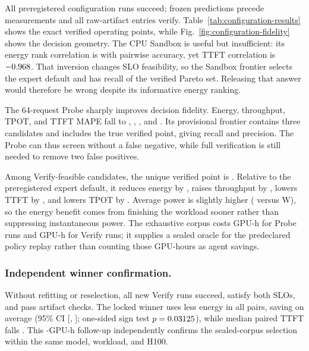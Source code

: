 All \ConfigurationMeasuredRuns{} preregistered configuration runs succeed;
frozen predictions precede measurements and all \ConfigurationRawArtifacts{}
raw-artifact entries verify.  Table~\ref{tab:configuration-results} shows the
exact verified operating points, while
Fig.~\ref{fig:configuration-fidelity} shows the decision geometry.  The CPU
Sandbox is useful but insufficient: its energy rank correlation is
\LzeroEnergySpearman{} with \LzeroEnergyPairwise{} pairwise accuracy, yet TTFT
correlation is $-0.968{}$.  That inversion changes SLO feasibility,
so the Sandbox frontier selects the expert default and has
\LzeroParetoRecall{} recall of the verified Pareto set.  Releasing that answer would
therefore be wrong despite its informative energy ranking.

The 64-request Probe sharply improves decision fidelity.  Energy,
throughput, TPOT, and TTFT MAPE fall to \LoneEnergyMAPE{},
\LoneThroughputMAPE{}, \LoneTPOTMAPE{}, and \LoneTTFTMAPE{}.  Its provisional
frontier contains three candidates and includes the true verified point, giving
\LoneParetoRecall{} recall and \LoneParetoPrecision{} precision.  The Probe can thus
screen without a false negative, while full verification is still needed to remove two false
positives.



Among \ConfigurationSLOFeasible{} Verify-feasible candidates, the unique verified
point is \VerifiedParetoConfig{}.  Relative to the preregistered expert default,
it reduces energy by \ParetoEnergyReduction{}, raises throughput by
\ParetoThroughputGain{}, lowers TTFT by \ParetoTTFTReduction{}, and lowers TPOT
by \ParetoTPOTReduction{}.  Average power is slightly higher
(\ParetoPower{} versus \ExpertPower{} W), so the energy benefit comes from
finishing the workload sooner rather than suppressing instantaneous power.  The
exhaustive corpus costs \ConfigurationLoneGPUHours{} GPU-h for Probe runs and
\ConfigurationLfourGPUHours{} GPU-h for Verify runs; it supplies a sealed oracle for the
predeclared policy replay rather than counting those GPU-hours as agent savings.



\subsubsection{Independent winner confirmation.}
Without refitting or reselection, all \WinnerConfirmationRuns{} new Verify runs
succeed, satisfy both SLOs, and pass artifact checks.  The locked winner uses
less energy in all \WinnerConfirmationPairs{} pairs, saving
\WinnerEnergySaving{} on average (95\% CI [\WinnerEnergyCILower{},
\WinnerEnergyCIUpper{}]; one-sided sign test $p=0.03125{}$),
while median paired TTFT falls \WinnerTTFTReduction{}.  This
\WinnerConfirmationGPUHours{}-GPU-h follow-up independently confirms the
sealed-corpus selection within the same model, workload, and H100.

